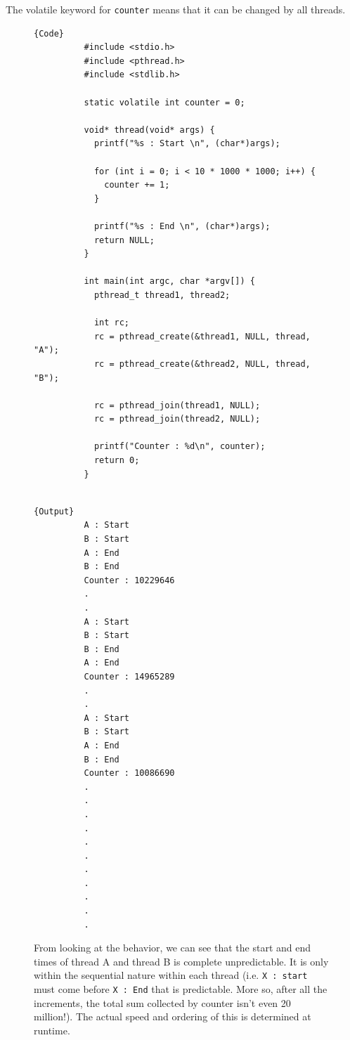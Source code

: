 \documentclass{article}
\begin{document}
    \begin{example}
      The volatile keyword for \texttt{counter} means that it can be changed by all threads. 

      \begin{figure}[H]
        \centering 
        \noindent\begin{minipage}{.75\textwidth}
        \begin{lstlisting}[]{Code}
          #include <stdio.h> 
          #include <pthread.h>
          #include <stdlib.h>

          static volatile int counter = 0; 

          void* thread(void* args) {
            printf("%s : Start \n", (char*)args); 

            for (int i = 0; i < 10 * 1000 * 1000; i++) {
              counter += 1; 
            }

            printf("%s : End \n", (char*)args); 
            return NULL; 
          }

          int main(int argc, char *argv[]) {
            pthread_t thread1, thread2; 

            int rc; 
            rc = pthread_create(&thread1, NULL, thread, "A"); 
            rc = pthread_create(&thread2, NULL, thread, "B"); 

            rc = pthread_join(thread1, NULL); 
            rc = pthread_join(thread2, NULL); 

            printf("Counter : %d\n", counter); 
            return 0; 
          }
                      
        \end{lstlisting}
        \end{minipage}
        \hfill
        \begin{minipage}{.24\textwidth}
        \begin{lstlisting}[]{Output}
          A : Start 
          B : Start 
          A : End 
          B : End 
          Counter : 10229646
          .
          .
          A : Start 
          B : Start 
          B : End 
          A : End 
          Counter : 14965289
          .
          .
          A : Start 
          B : Start 
          A : End 
          B : End 
          Counter : 10086690
          .
          .
          .
          .
          .
          .
          .
          .
          .
          .
          .
        \end{lstlisting}
        \end{minipage}
        \caption{From looking at the behavior, we can see that the start and end times of thread A and thread B is complete unpredictable. It is only within the sequential nature within each thread (i.e. \texttt{X : start} must come before \texttt{X : End} that is predictable. More so, after all the increments, the total sum collected by counter isn't even 20 million!). The actual speed and ordering of this is determined at runtime. } 
        \label{fig:unpredictable}
      \end{figure}


\end{example}
\end{document}
